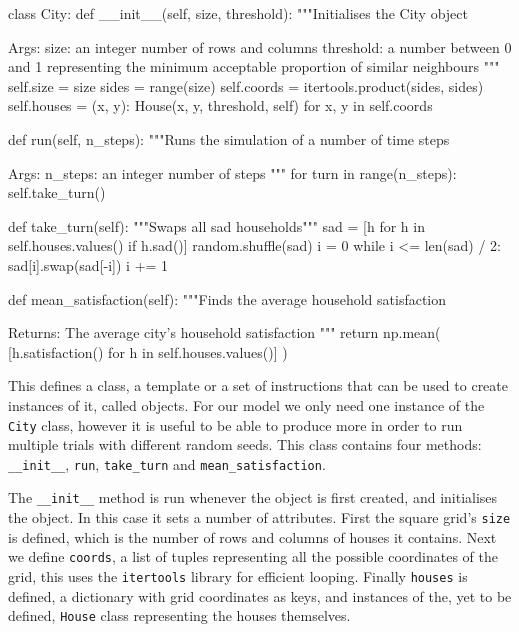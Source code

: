 \begin{pyin}
class City:
    def __init__(self, size, threshold):
        """Initialises the City object

        Args:
            size: an integer number of rows and columns
            threshold: a number between 0 and 1 representing
              the minimum acceptable proportion of similar
              neighbours
        """
        self.size = size
        sides = range(size)
        self.coords = itertools.product(sides, sides)
        self.houses = {
            (x, y): House(x, y, threshold, self)
            for x, y in self.coords}
    
    def run(self, n_steps):
        """Runs the simulation of a number of time steps

        Args:
            n_steps: an integer number of steps
        """
        for turn in range(n_steps):
            self.take_turn()

    def take_turn(self):
        """Swaps all sad households"""
        sad = [h for h in self.houses.values() if h.sad()]
        random.shuffle(sad)
        i = 0
        while i <= len(sad) / 2:
            sad[i].swap(sad[-i])
            i += 1
                
    def mean_satisfaction(self):
        """Finds the average household satisfaction

        Returns:
            The average city's household satisfaction
        """
        return np.mean(
            [h.satisfaction() for h in self.houses.values()]
        )
\end{pyin}

This defines a class, a template or a set of instructions that can be used to
create instances of it, called objects.
For our model we only need one instance of the \texttt{City} class,
however it is useful to be able to produce more in order to run multiple trials
with different random seeds.
This class contains four methods: \texttt{__init__},
\texttt{run}, \texttt{take_turn} and
\texttt{mean_satisfaction}.

The \texttt{__init__} method is run whenever the object is first
created, and initialises the object.
In this case it sets a number of attributes.
First the square grid's \texttt{size} is defined, which is the
number of rows and columns of houses it contains.
Next we define \texttt{coords}, a list of tuples representing all
the possible coordinates of the grid, this uses the
\texttt{itertools} library for efficient looping.
Finally \texttt{houses} is defined, a dictionary with grid
coordinates as keys, and instances of the, yet to be defined,
\texttt{House} class representing the houses themselves.

